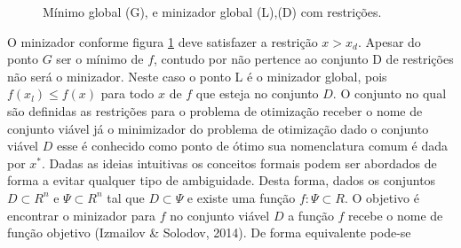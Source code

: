 \documentclass[12pt,fleqn]{article}
\begin{document}
\begin{figure}[!h]
  \centering
{}
  \caption{M\'inimo global (G), e minizador global (L),(D) com restri\c c\~oes.} 
\label{fig3}
\end{figure}
O minizador conforme figura \ref{fig3} deve satisfazer a restri\c c\~ao $x > x_d$. Apesar do ponto
$G$ ser o m\'inimo de $f$, contudo por n\~ao pertence ao conjunto D de restri\c c\~oes n\~ao ser\'a o minizador. Neste
caso o ponto L \'e o minizador global, pois $f(x_l) \leq f(x)$ para todo $x$ de $f$ que esteja no conjunto
$D$. O conjunto no qual s\~ao definidas as restri\c c\~oes para o problema de otimiza\c c\~ao receber o nome
de conjunto vi\'avel j\'a o minimizador do problema de
otimiza\c c\~ao dado o conjunto vi\'avel $D$ esse \'e conhecido como ponto de \'otimo sua nomenclatura
comum \'e dada por ${x}^{*}$. Dadas as ideias intuitivas os
conceitos formais podem ser abordados de forma a evitar qualquer tipo de ambiguidade. Desta
forma, dados os conjuntos $D \subset {R}^{n}$ e $\Psi \subset {R}^{n}$ tal que $D
\subset \Psi $ e existe uma fun\c c\~ao $f: \Psi \subset R$. O objetivo \'e encontrar o minizador para
$f$ no conjunto  vi\'avel $D$ a fun\c c\~ao $f$ recebe o nome de fun\c c\~ao objetivo (Izmailov \& Solodov, 2014). De forma equivalente pode-se
\end{document}
